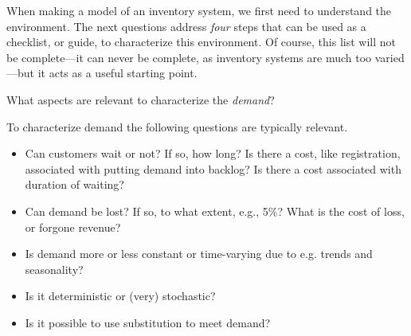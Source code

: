 When making a model of an inventory system, we first need to understand the environment.
The next questions address \emph{four} steps that can be used as a checklist, or guide, to characterize this environment. Of course, this list will not  be complete---it can never be complete, as inventory systems are much too varied---but it acts as a useful starting point.

\begin{exercise}
  What aspects are relevant to characterize the \emph{demand}?
  \begin{solution}
    To characterize demand the following questions are typically relevant.
      \begin{itemize}
      \item Can customers wait or not?  If so, how long? Is there a
        cost, like registration, associated with putting demand into
        backlog? Is there a cost associated with duration of waiting?
      \item Can demand be lost? If so, to what extent, e.g., 5\%? What
        is the cost of loss, or forgone revenue? 
      \item Is demand more or less constant or time-varying due to e.g. trends and seasonality?
      \item Is it deterministic or (very) stochastic? 
      \item Is it possible to use substitution to meet demand?
      \end{itemize}
  \end{solution}
\end{exercise}


